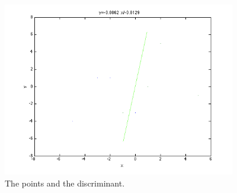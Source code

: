 \documentclass[12pt]{article}
\begin{document}
\begin{enumerate}
\begin{enumerate}
\begin{figure}[H]
\centering
\includegraphics[width=4in]{1}
\caption{The points and the discriminant.}
\end{figure}
\end{enumerate}
\end{enumerate}
\end{document}
